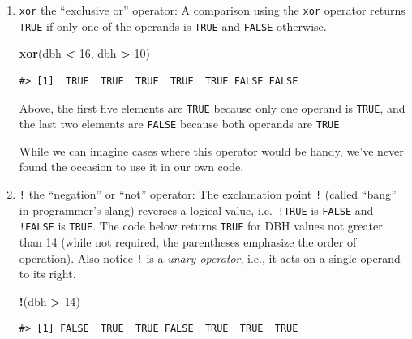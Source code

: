 \documentclass[
  11pt,
]{krantz}
\newenvironment{Shaded}{\begin{snugshade}}{\end{snugshade}}
\newcommand{\DecValTok}[1]{\textcolor[rgb]{0.00,0.00,0.81}{#1}}
\newcommand{\KeywordTok}[1]{\textcolor[rgb]{0.13,0.29,0.53}{\textbf{#1}}}
\newcommand{\NormalTok}[1]{#1}
\newcommand{\OperatorTok}[1]{\textcolor[rgb]{0.81,0.36,0.00}{\textbf{#1}}}
\newcommand{\StringTok}[1]{\textcolor[rgb]{0.31,0.60,0.02}{#1}}
\theoremstyle{definition}
\theoremstyle{definition}
\theoremstyle{definition}
\theoremstyle{definition}
\theoremstyle{remark}
\begin{document}
\begin{enumerate}
\begin{Shaded}
\begin{Highlighting}[]
\NormalTok{    dbh }\OperatorTok{\textless{}}\StringTok{ }\DecValTok{16} \OperatorTok{|}\StringTok{ }\NormalTok{dbh }\OperatorTok{\textgreater{}}\StringTok{ }\DecValTok{10}
\end{Highlighting}
\end{Shaded}

\begin{verbatim}
#> [1] TRUE TRUE TRUE TRUE TRUE TRUE TRUE
\end{verbatim}

  Not surprisingly, this operation returns \texttt{TRUE} for all elements, because all elements in \texttt{dbh} are either less than 16 or greater than 10.
\item
  \texttt{xor} the ``exclusive or'' operator: A comparison using the \texttt{xor} operator returns \texttt{TRUE} if only one of the operands is \texttt{TRUE} and \texttt{FALSE} otherwise.

\begin{Shaded}
\begin{Highlighting}[]
\KeywordTok{xor}\NormalTok{(dbh }\OperatorTok{\textless{}}\StringTok{ }\DecValTok{16}\NormalTok{, dbh }\OperatorTok{\textgreater{}}\StringTok{ }\DecValTok{10}\NormalTok{)}
\end{Highlighting}
\end{Shaded}

\begin{verbatim}
#> [1]  TRUE  TRUE  TRUE  TRUE  TRUE FALSE FALSE
\end{verbatim}

  Above, the first five elements are \texttt{TRUE} because only one operand is \texttt{TRUE}, and the last two elements are \texttt{FALSE} because both operands are \texttt{TRUE}.

  While we can imagine cases where this operator would be handy, we've never found the occasion to use it in our own code.
\item
  \texttt{!} the ``negation'' or ``not'' operator: The exclamation point \texttt{!} (called ``bang'' in programmer's slang) reverses a logical value, i.e.~\texttt{!TRUE} is \texttt{FALSE} and \texttt{!FALSE} is \texttt{TRUE}. The code below returns \texttt{TRUE} for DBH values not greater than 14 (while not required, the parentheses emphasize the order of operation). Also notice \texttt{!} is a \emph{unary operator}, i.e., it acts on a single operand to its right.

\begin{Shaded}
\begin{Highlighting}[]
\OperatorTok{!}\NormalTok{(dbh }\OperatorTok{\textgreater{}}\StringTok{ }\DecValTok{14}\NormalTok{)}
\end{Highlighting}
\end{Shaded}

\begin{verbatim}
#> [1] FALSE  TRUE  TRUE FALSE  TRUE  TRUE  TRUE
\end{verbatim}
\end{enumerate}
\end{document}
